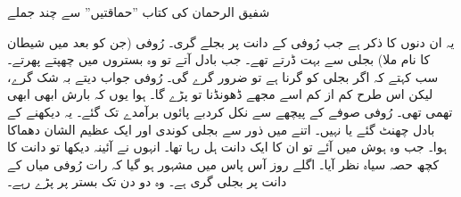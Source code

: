 \documentclass{article}
\begin{document}

\setRTL                 %
\linespread{1.9}        %

\begin{center}          %
شفیق الرحمان کی کتاب ''حماقتیں'' سے چند جملے
\end{center}
\vspace{2\baselineskip}    %

یہ ان دنوں کا ذکر ہے جب رُوفی کے دانت پر بجلے گری۔ رُوفی (جن کو بعد میں شیطان کا نام ملا) بجلی سے بہت ڈرتے تھے۔ جب بادل آتے تو وہ بستروں میں چھپتے پھرتے۔ سب کہتے کہ اگر بجلی کو گرنا ہے تو ضرور گرے گی۔ رُوفی جواب دیتے بہ شک گرے، لیکن اس طرح کم از کم اسے مجھے ڈھونڈنا تو پڑے گا۔ ہوا یوں کہ بارش ابھی ابھی تھمی تھی۔ رُوفی صوفے کے پیچھے سے نکل کردبے پائوں برآمدے تک گئے۔ یہ دیکھنے کے بادل چھنٹ گئے یا نہیں۔ اتنے میں ذور سے بجلی کوندی اور ایک عظیم الشان دھماکا ہوا۔ جب وہ ہوش میں آئے تو ان کا ایک دانت ہل رہا تھا۔ انہوں نے آئینہ دیکھا تو دانت کا کچھ حصہ سیاہ نظر آیا۔ اگلے روز آس پاس میں مشہور ہو گیا کہ رات رُوفی میاں کے دانت پر بجلی گری ہے۔ وہ دو دن تک بستر پر پڑے رہے۔
\end{document}
